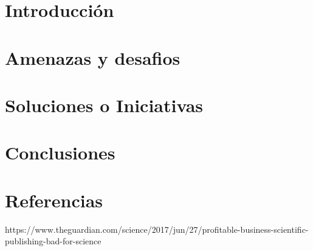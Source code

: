 \section{Introducción}
\section{Amenazas y desafios}



\section{Soluciones o Iniciativas}
\section{Conclusiones}
\section{Referencias}

https://www.theguardian.com/science/2017/jun/27/profitable-business-scientific-publishing-bad-for-science
